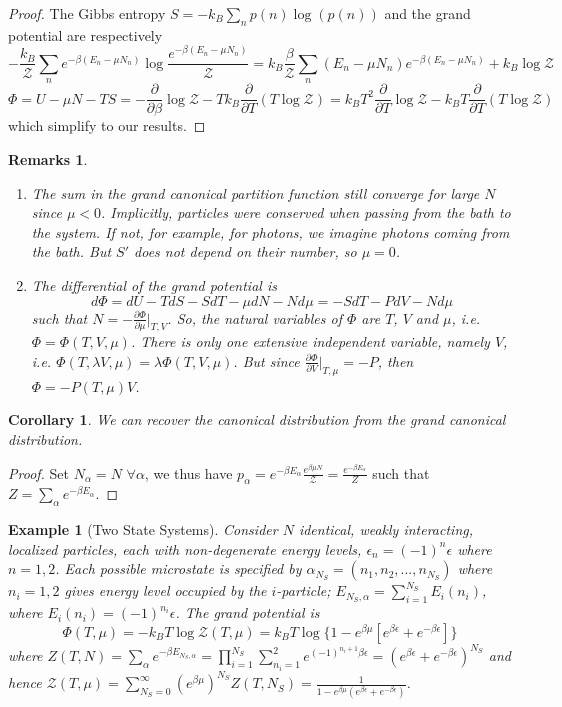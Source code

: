 \documentclass[a4paper]{article}
\newtheorem{eg}{Example}[section]
\newtheorem{remarks}{Remarks}[section]
\theoremstyle{new}
\newtheorem{cor}{Corollary}[section]
\begin{document}
\begin{proof}
The Gibbs entropy $S=-k_B\sum_np(n)\log(p(n))$ and the grand potential are respectively 
$$-\frac{k_B}{\mathcal{Z}}\sum_ne^{-\beta (E_n-\mu N_n)}\log\frac{e^{-\beta (E_n-\mu N_n)}}{\mathcal{Z}}=k_B\frac{\beta}{\mathcal{Z}}\sum_n(E_n-\mu N_n)e^{-\beta (E_n-\mu N_n)}+k_B\log\mathcal{Z}$$
$$\Phi=U-\mu N-TS=-\frac{\partial}{\partial\beta}\log\mathcal{Z}-Tk_B\frac{\partial}{\partial T}(T\log\mathcal{Z})=k_BT^2\frac{\partial}{\partial T}\log\mathcal{Z}-k_BT\frac{\partial}{\partial T}(T\log\mathcal{Z})$$
which simplify to our results.
\end{proof}
\begin{remarks}\leavevmode
\begin{enumerate}
\item The sum in the grand canonical partition function still converge for large $N$ since $\mu<0$. Implicitly, particles were conserved when passing from the bath to the system. If not, for example, for photons, we imagine photons coming from the bath. But $S'$ does not depend on their number, so $\mu=0$. 
\item The differential of the grand potential is
$$d\Phi=dU-TdS-SdT-\mu dN-Nd\mu=-SdT-PdV-Nd\mu$$
such that $N=-\frac{\partial\Phi}{\partial\mu}|_{T,V}$. So, the natural variables of $\Phi$ are $T$, $V$ and $\mu$, i.e. $\Phi=\Phi(T,V,\mu)$. There is only one extensive independent variable, namely $V$, i.e. $\Phi(T,\lambda V,\mu)=\lambda\Phi(T,V,\mu)$. But since $\frac{\partial\Phi}{\partial V}|_{T,\mu}=-P$, then $\Phi=-P(T,\mu)V$.
\end{enumerate}
\end{remarks}
\begin{cor}
We can recover the canonical distribution from the grand canonical distribution.
\end{cor}
\begin{proof}
Set $N_\alpha=N$ $\forall\alpha$, we thus have $p_\alpha=e^{-\beta E_\alpha}\frac{e^{\beta\mu N}}{\mathcal{Z}}=\frac{e^{-\beta E_\alpha}}{Z}$ such that $Z=\sum_\alpha e^{-\beta E_\alpha}$.
\end{proof}
\begin{eg}[Two State Systems]
Consider $N$ identical, weakly interacting, localized particles, each with non-degenerate energy levels, $\epsilon_n=(-1)^n\epsilon$ where $n=1,2$. Each possible microstate is specified by $\alpha_{N_S}=(n_1,n_2,...,n_{N_S})$ where $n_i=1,2$ gives energy level occupied by the $i$-particle; $E_{N_S,\alpha}=\sum_{i=1}^{N_S}E_i(n_i)$, where $E_i(n_i)=(-1)^{n_i}\epsilon$. The grand potential is
$$\Phi(T,\mu)=-k_BT\log\mathcal{Z}(T,\mu)=k_BT\log\{1-e^{\beta\mu}[e^{\beta\epsilon}+e^{-\beta\epsilon}]\}$$
where $Z(T,N)=\sum_\alpha e^{-\beta E_{N_S,\alpha}}=\prod_{i=1}^{N_S}\sum_{n_i=1}^2e^{(-1)^{n_i+1}\beta\epsilon}=(e^{\beta\epsilon}+e^{-\beta\epsilon})^{N_S}$ and hence $\mathcal{Z}(T,\mu)=\sum_{N_S=0}^\infty (e^{\beta\mu})^{N_S}Z(T,N_S)=\frac{1}{1-e^{\beta\mu}(e^{\beta\epsilon}+e^{-\beta\epsilon})}$.
\end{eg}
\end{document}

